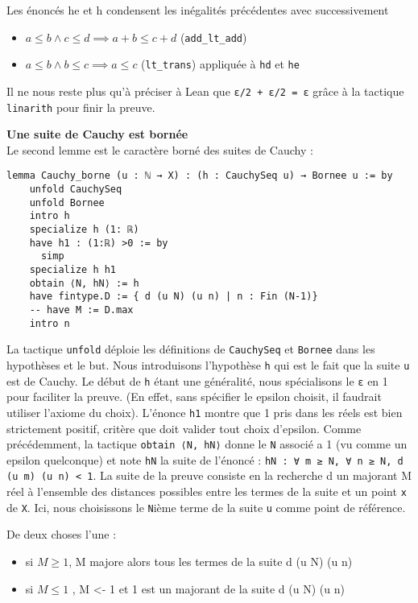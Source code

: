 \documentclass[a4paper, 12pt]{article}
\newcommand{\lean}[1]{\texttt{#1}}
\begin{document}
Les énoncés he et h condensent les inégalités précédentes avec successivement
\begin{itemize}
    \item $a \leq b \land c\leq d \implies a+b \leq c+d$ (\lean{add_lt_add})
    \item $a \leq b \land b \leq c \implies a\leq c$ (\lean{lt_trans}) appliquée à \lean{hd} et \lean{he}
\end{itemize}

Il ne nous reste plus qu'à préciser à Lean que \lean{ε/2 + ε/2 = ε} grâce à la tactique \lean{linarith} pour finir la preuve.

\vspace{\baselineskip}
\textbf{Une suite de Cauchy est bornée}\\

Le second lemme est le caractère borné des suites de Cauchy :

\begin{verbatim}
lemma Cauchy_borne (u : ℕ → X) : (h : CauchySeq u) → Bornee u := by
    unfold CauchySeq
    unfold Bornee
    intro h
    specialize h (1: ℝ)
    have h1 : (1:ℝ) >0 := by
      simp
    specialize h h1
    obtain ⟨N, hN⟩ := h
    have fintype.D := { d (u N) (u n) | n : Fin (N-1)}
    -- have M := D.max
    intro n
\end{verbatim}


La tactique \lean{unfold} déploie les définitions de \lean{CauchySeq} et \lean{Bornee} dans les hypothèses et le but. Nous introduisons l'hypothèse \lean{h} qui est le fait que la suite \lean{u} est de Cauchy. Le début de \lean{h} étant une généralité, nous spécialisons le \lean{ε} en 1 pour faciliter la preuve. (En effet, sans spécifier le epsilon choisit, il faudrait utiliser l'axiome du choix). L'énonce \lean{h1} montre que 1 pris dans les réels est bien strictement positif, critère que doit valider tout choix d'epsilon. Comme précédemment, la tactique \lean{obtain ⟨N, hN⟩} donne le \lean{N} associé a 1 (vu comme un epsilon quelconque) et note \lean{hN} la suite de l'énoncé : \lean{hN : ∀ m ≥ N, ∀ n ≥ N, d (u m) (u n) < 1}. La suite de la preuve consiste en la recherche d un majorant M réel à l'ensemble des distances possibles entre les termes de la suite et un point \lean{x} de \lean{X}. Ici, nous choisissons le \lean{N}ième terme de la suite \lean{u} comme point de référence.

De deux choses l'une :
\begin{itemize}
    \item si $M \geq 1$, M majore alors tous les termes de la suite d (u N) (u n)
    \item si $M \leq  1$ , M <- 1 et 1 est un majorant de la suite d (u N) (u n)
\end{itemize}
\end{document}
